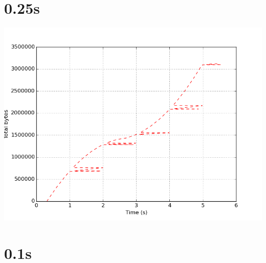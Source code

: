 \documentclass{article}
\begin{document}
\section{0.25s}
    \noindent\begin{minipage}{.45\textwidth}
    
    \end{minipage}\hfill
    \begin{minipage}{.45\textwidth}
    
    \end{minipage}
    
    \begin{center}
    \includegraphics{set_a_0.25s/set_a_0_25s.png}
    \end{center}
\clearpage

\section{0.1s}
    \noindent\begin{minipage}{.45\textwidth}
    
    \end{minipage}\hfill
    \begin{minipage}{.45\textwidth}
    
    \end{minipage}
    
\end{document}
